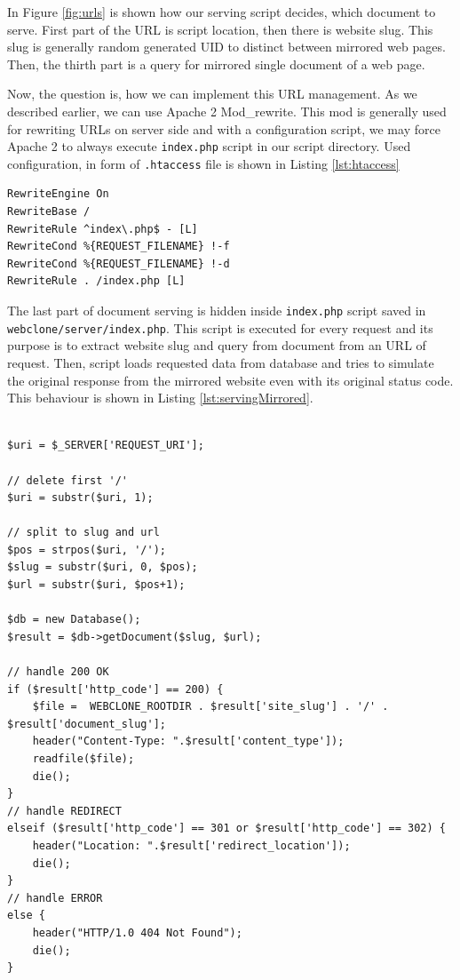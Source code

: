 In Figure \ref{fig:urls} is shown how our serving script decides, which document to serve. First part of the URL is script location, then there is website slug. This slug is generally random generated UID to distinct between mirrored web pages. Then, the thirth part is a query for mirrored single document of a web page.

Now, the question is, how we can implement this URL management. As we described earlier, we can use Apache 2 Mod\_rewrite. This mod is generally used for rewriting URLs on server side and with a configuration script, we may force Apache 2 to always execute \texttt{index.php} script in our script directory. Used configuration, in form of \texttt{.htaccess} file is shown in Listing \ref{lst:htaccess}

\begin{lstlisting}[caption={Example of .htaccess for Apache 2 mod\_rewrite},label={lst:htaccess}]
RewriteEngine On
RewriteBase /
RewriteRule ^index\.php$ - [L]
RewriteCond %{REQUEST_FILENAME} !-f
RewriteCond %{REQUEST_FILENAME} !-d
RewriteRule . /index.php [L]
\end{lstlisting}

The last part of document serving is hidden inside \texttt{index.php} script saved in \texttt{webclone/server/index.php}. This script is executed for every request and its purpose is to extract website slug and query from document from an URL of request. Then, script loads requested data from database and tries to simulate the original response from the mirrored website even with its original status code.  This behaviour is shown in Listing \ref{lst:servingMirrored}.

\begin{lstlisting}[caption={Serving of mirrored documents},label={lst:servingMirrored}]

$uri = $_SERVER['REQUEST_URI'];

// delete first '/'
$uri = substr($uri, 1);

// split to slug and url
$pos = strpos($uri, '/');
$slug = substr($uri, 0, $pos);
$url = substr($uri, $pos+1);

$db = new Database();
$result = $db->getDocument($slug, $url);

// handle 200 OK
if ($result['http_code'] == 200) {
    $file =  WEBCLONE_ROOTDIR . $result['site_slug'] . '/' . $result['document_slug'];
    header("Content-Type: ".$result['content_type']);
    readfile($file);
    die();
} 
// handle REDIRECT
elseif ($result['http_code'] == 301 or $result['http_code'] == 302) {
    header("Location: ".$result['redirect_location']);
    die();
}
// handle ERROR
else {
    header("HTTP/1.0 404 Not Found");
    die();
}
\end{lstlisting}
